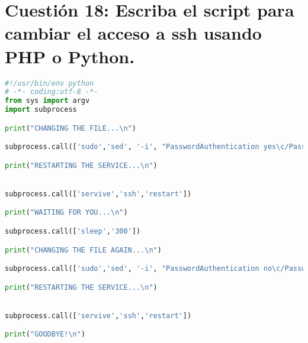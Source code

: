 \section{Cuestión 18: Escriba el script para cambiar el acceso a ssh usando PHP o Python.}

\begin{lstlisting}[language=python]
#!/usr/bin/env python
# -*- coding:utf-8 -*-
from sys import argv
import subprocess

print("CHANGING THE FILE...\n")

subprocess.call(['sudo','sed', '-i', "PasswordAuthentication yes\c/PasswordAuthentication no", '/etc/ssh/sshd_config'])

print("RESTARTING THE SERVICE...\n")


subprocess.call(['servive','ssh','restart'])

print("WAITING FOR YOU...\n")

subprocess.call(['sleep','300'])

print("CHANGING THE FILE AGAIN...\n")

subprocess.call(['sudo','sed', '-i', "PasswordAuthentication no\c/PasswordAuthentication yes", '/etc/ssh/sshd_config'])

print("RESTARTING THE SERVICE...\n")


subprocess.call(['servive','ssh','restart'])

print("GOODBYE!\n")

\end{lstlisting}

